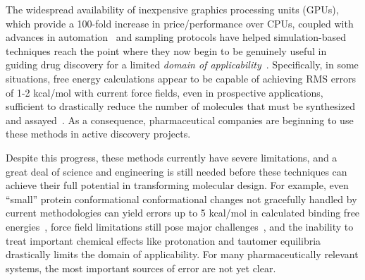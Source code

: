 \documentclass[11pt]{article}
\begin{document}
The widespread availability of inexpensive graphics processing units (GPUs), which provide a 100-fold increase in price/performance over CPUs, coupled with advances in automation~\cite{liu_lead_2013} and sampling protocols have helped simulation-based techniques reach the point where they now begin to be genuinely useful in guiding drug discovery for a limited \emph{domain of applicability}~\cite{mikulskis_large-scale_2014, homeyer_binding_2014, sherborne_preprint_2016,  schrodinger_accurate_2015, christ_binding_2016, cui_affinity_2016, verras_free_2016}.
Specifically, in some situations, free energy calculations appear to be capable of achieving RMS errors of 1-2 kcal/mol with current force fields, even in prospective applications, sufficient to drastically reduce the number of molecules that must be synthesized and assayed~\cite{shirts-mobley-brown}.
As a consequence, pharmaceutical companies are beginning to use these methods in active discovery projects.

Despite this progress, these methods currently have severe limitations, and a great deal of science and engineering is still needed before these techniques can achieve their full potential in transforming molecular design.
For example, even ``small'' protein conformational conformational changes not gracefully handled by current methodologies can yield errors up to 5 kcal/mol in calculated binding free energies~\cite{lim_sensitivity_2016}, force field limitations still pose major challenges~\cite{rocklin_blind_2013}, and the inability to treat important chemical effects like protonation and tautomer equilibria drastically limits the domain of applicability.
For many pharmaceutically relevant systems, the most important sources of error are not yet clear.
\end{document}
